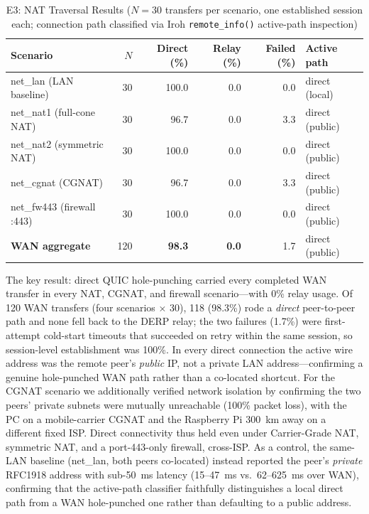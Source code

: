 ﻿\documentclass[journal]{IEEEtran}
\begin{document}
\begin{table}[t]
\centering
\caption{E3: NAT Traversal Results ($N{=}30$ transfers per scenario, one established session each; connection path classified via Iroh \texttt{remote\_info()} active-path inspection)}
\label{tab:e3}
\footnotesize
\begin{tabular}{l r r r r l}
\toprule
\textbf{Scenario} & \textbf{$N$} & \textbf{Direct (\%)} & \textbf{Relay (\%)} & \textbf{Failed (\%)} & \textbf{Active path} \\
\midrule
net\_lan   (LAN baseline)   & 30 & 100.0 & 0.0 & 0.0 & direct (local)  \\
net\_nat1  (full-cone NAT)  & 30 & 96.7  & 0.0 & 3.3 & direct (public) \\
net\_nat2  (symmetric NAT)  & 30 & 100.0 & 0.0 & 0.0 & direct (public) \\
net\_cgnat (CGNAT)          & 30 & 96.7  & 0.0 & 3.3 & direct (public) \\
net\_fw443 (firewall :443)  & 30 & 100.0 & 0.0 & 0.0 & direct (public) \\
\midrule
\textbf{WAN aggregate}      & 120 & \textbf{98.3} & \textbf{0.0} & 1.7 & direct (public) \\
\bottomrule
\end{tabular}
\end{table}

The key result: direct QUIC hole-punching carried every completed WAN transfer in every NAT, CGNAT, and firewall scenario---with 0\% relay usage. Of 120 WAN transfers (four scenarios $\times$ 30), 118 (98.3\%) rode a \emph{direct} peer-to-peer path and none fell back to the DERP relay; the two failures (1.7\%) were first-attempt cold-start timeouts that succeeded on retry within the same session, so session-level establishment was 100\%. In every direct connection the active wire address was the remote peer's \emph{public} IP, not a private LAN address---confirming a genuine hole-punched WAN path rather than a co-located shortcut. For the CGNAT scenario we additionally verified network isolation by confirming the two peers' private subnets were mutually unreachable (100\% packet loss), with the PC on a mobile-carrier CGNAT and the Raspberry Pi 300~km away on a different fixed ISP. Direct connectivity thus held even under Carrier-Grade NAT, symmetric NAT, and a port-443-only firewall, cross-ISP. As a control, the same-LAN baseline (net\_lan, both peers co-located) instead reported the peer's \emph{private} RFC1918 address with sub-50~ms latency (15--47~ms vs.~62--625~ms over WAN), confirming that the active-path classifier faithfully distinguishes a local direct path from a WAN hole-punched one rather than defaulting to a public address.
\end{document}
